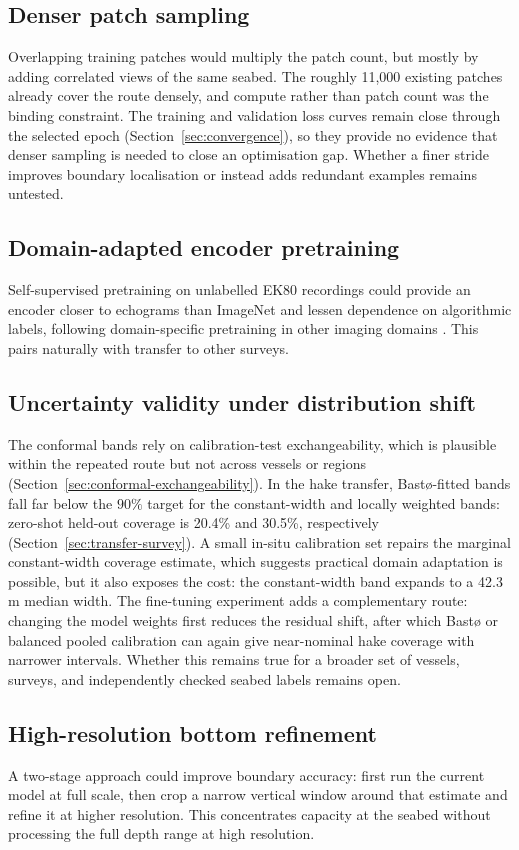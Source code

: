 \subsection{Denser patch sampling}
Overlapping training patches would multiply the patch count, but mostly by adding correlated views of the same seabed. The roughly 11{,}000 existing patches already cover the route densely, and compute rather than patch count was the binding constraint. The training and validation loss curves remain close through the selected epoch (Section~\ref{sec:convergence}), so they provide no evidence that denser sampling is needed to close an optimisation gap. Whether a finer stride improves boundary localisation or instead adds redundant examples remains untested.

\subsection{Domain-adapted encoder pretraining}
Self-supervised pretraining on unlabelled EK80 recordings could provide an encoder closer to echograms than ImageNet and lessen dependence on algorithmic labels, following domain-specific pretraining in other imaging domains \cite{chen_simple_2020,azizi_big_2021}. This pairs naturally with transfer to other surveys.

\subsection{Uncertainty validity under distribution shift}
The conformal bands rely on calibration-test exchangeability, which is plausible within the repeated route but not across vessels or regions (Section~\ref{sec:conformal-exchangeability}). In the hake transfer, Bast\o{}-fitted bands fall far below the $90\%$ target for the constant-width and locally weighted bands: zero-shot held-out coverage is 20.4\% and 30.5\%, respectively (Section~\ref{sec:transfer-survey}). A small in-situ calibration set repairs the marginal constant-width coverage estimate, which suggests practical domain adaptation is possible, but it also exposes the cost: the constant-width band expands to a 42.3\,m median width. The fine-tuning experiment adds a complementary route: changing the model weights first reduces the residual shift, after which Bast\o{} or balanced pooled calibration can again give near-nominal hake coverage with narrower intervals. Whether this remains true for a broader set of vessels, surveys, and independently checked seabed labels remains open.

\subsection{High-resolution bottom refinement}\label{sec:highres-refinement}
A two-stage approach could improve boundary accuracy: first run the current model at full scale, then crop a narrow vertical window around that estimate and refine it at higher resolution. This concentrates capacity at the seabed without processing the full depth range at high resolution.

